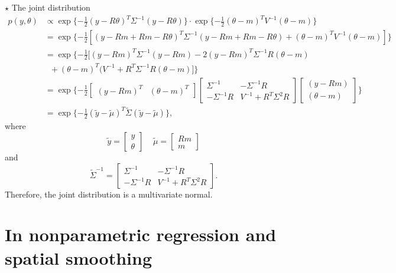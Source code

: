\documentclass[11pt]{article}
\newcommand{\jie}{$\star$ }
\renewcommand{\th}{\theta}
\begin{document}
\begin{enumerate}[(A)]
\bigskip \jie
The joint distribution
\begin{align*}
    p(y, \th) &\propto \exp \{ -\frac{1}2 (y - R\th)^T \Sigma^{-1} (y - R\th) \} \cdot \exp \{ -\frac{1}2 (\th - m)^T V^{-1} (\th - m)\} \\
    &= \exp \{-\frac{1}2 [(y - Rm + Rm - R \th)^T \Sigma^{-1}(y - Rm + Rm - R \th) + (\th - m)^T V^{-1} (\th - m)]\} \\
    &= \exp \{-\frac{1}2 [(y - Rm)^T \Sigma^{-1}(y - Rm) - 2(y - Rm)^T \Sigma^{-1} R(\th - m) \\ &\;\; + (\th - m)^T (V^{-1} + R^T \Sigma^{-1} R (\th - m)]\} \\
    &= \exp\{ -\frac{1}2 \begin{bmatrix}
    (y - Rm)^T & (\th - m)^T
    \end{bmatrix}
    \begin{bmatrix}
    \Sigma^{-1} & -\Sigma^{-1}R \\
    -\Sigma^{-1}R & V^{-1} + R^T\Sigma^2 R
    \end{bmatrix}
    \begin{bmatrix}
    (y - Rm) \\ (\th - m)
    \end{bmatrix} \} \\
    &= \exp\{ -\frac{1}2 (\tilde{y} - \tilde{\mu})^T \tilde{\Sigma} (\tilde{y} - \tilde{\mu}) \},
\end{align*}
where
$$\tilde{y} = \begin{bmatrix}
y \\ \th
\end{bmatrix} \;\;\;\;
\tilde{\mu} = \begin{bmatrix}
Rm \\ m
\end{bmatrix}$$
and
$$\tilde{\Sigma}^{-1} = 
\begin{bmatrix}
    \Sigma^{-1} & -\Sigma^{-1}R \\
    -\Sigma^{-1}R & V^{-1} + R^T\Sigma^2 R
\end{bmatrix}.$$
Therefore, the joint distribution is a multivariate normal.

\end{enumerate}

\clearpage \newpage
\section{In nonparametric regression and spatial smoothing}
\end{document}
